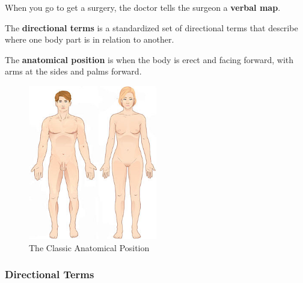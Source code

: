 When you go to get a surgery, the doctor tells the surgeon a \textbf{verbal
	map}.

\begin{definition}
	\label{def:directional_terms}

	The \textbf{directional terms} is a standardized set of directional terms
	that describe where one body part is in relation to another.
\end{definition}

\begin{definition}
	\label{def:anatomical_position}

	The \textbf{anatomical position} is when the body is erect and facing
	forward, with arms at the sides and palms forward.
\end{definition}

\begin{figure}[H]
	\centering
	\includegraphics[width=0.5\textwidth]{img/classic-anatomical-position}
	\caption{The Classic Anatomical Position}
	\label{fig:the_classic_anatomical_position}
\end{figure}

\subsubsection*{Directional Terms}
\label{sub_sub_sec:directional_terms}

